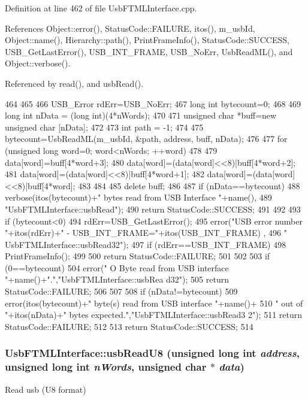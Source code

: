 Definition at line 462 of file UsbFTMLInterface.cpp.

References Object::error(), StatusCode::FAILURE, itos(), m\_\-usbId, Object::name(), Hierarchy::path(), PrintFrameInfo(), StatusCode::SUCCESS, USB\_\-GetLastError(), USB\_\-INT\_\-FRAME, USB\_\-NoErr, UsbReadML(), and Object::verbose().

Referenced by read(), and usbRead().


\begin{DoxyCode}
464                                                               {
465   
466   USB_Error rdErr=USB_NoErr;
467   long int bytecount=0;
468 
469   long int nData = (long int)(4*nWords);
470   
471   unsigned char *buff=new unsigned char [nData];
472 
473   int path = -1;
474   
475   bytecount=UsbReadML(m_usbId, &path, address, buff, nData);
476 
477   for (unsigned long word=0; word<nWords; ++word)
478   {
479     data[word]=buff[4*word+3];
480     data[word]=(data[word]<<8)|buff[4*word+2];
481     data[word]=(data[word]<<8)|buff[4*word+1];
482     data[word]=(data[word]<<8)|buff[4*word];
483   }
484 
485   delete buff;
486 
487   if (nData==bytecount){
488     verbose(itos(bytecount)+" bytes read from USB Interface "+name(),
489             "UsbFTMLInterface::usbRead");
490     return StatusCode::SUCCESS;
491   }
492 
493   if (bytecount<0){
494     rdErr=USB_GetLastError();
495     error("USB error number "+itos(rdErr)+" - USB_INT_FRAME="+itos(USB_INT_FRAME)
      ,
496             " UsbFTMLInterface::usbRead32");
497     if (rdErr==USB_INT_FRAME){
498       PrintFrameInfo();
499     } 
500     return StatusCode::FAILURE;
501   }
502   
503   if (0==bytecount){
504     error(" O Byte read from USB interface "+name()+".","UsbFTMLInterface::usbRea
      d32");
505     return StatusCode::FAILURE;
506   }
507 
508   if (nData!=bytecount){
509     error(itos(bytecount)+" byte(s) read from USB interface "+name()+
510             " out of "+itos(nData)+" bytes expected.","UsbFTMLInterface::usbRead3
      2");
511     return StatusCode::FAILURE;    
512   }
513   return StatusCode::SUCCESS;
514 }
\end{DoxyCode}
\hypertarget{classUsbFTMLInterface_ac356419a8bbaa26e63f182a86e5fd380}{
\subsubsection[{usbReadU8}]{ UsbFTMLInterface::usbReadU8 (unsigned long int {\em address}, \/  unsigned long int {\em nWords}, \/  unsigned char $\ast$ {\em data})}}
\label{classUsbFTMLInterface_ac356419a8bbaa26e63f182a86e5fd380}
Read usb (U8 format) 

